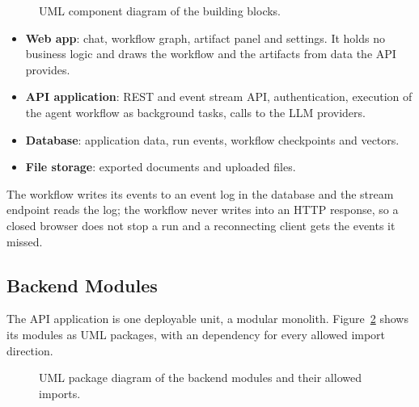 \begin{figure}[H]
    \centering
    \resizebox{\linewidth}{!}{}
    \caption{UML component diagram of the building blocks.}
    \label{fig:sd-building-blocks}
\end{figure}

\begin{itemize}
    \item \textbf{Web app}: chat, workflow graph, artifact panel and settings. It holds no business logic and draws the workflow and the artifacts from data the API provides.
    \item \textbf{API application}: REST and event stream API, authentication, execution of the agent workflow as background tasks, calls to the LLM providers.
    \item \textbf{Database}: application data, run events, workflow checkpoints and vectors.
    \item \textbf{File storage}: exported documents and uploaded files.
\end{itemize}
The workflow writes its events to an event log in the database and the stream endpoint reads the log; the workflow never writes into an HTTP response, so a closed browser does not stop a run and a reconnecting client gets the events it missed.

\subsection{Backend Modules}
\label{sec:sd-backend-modules}
The API application is one deployable unit, a modular monolith. Figure~\ref{fig:sd-backend-modules} shows its modules as UML packages, with an  dependency for every allowed import direction.

\begin{figure}[H]
    \centering
    \resizebox{0.85\linewidth}{!}{}
    \caption{UML package diagram of the backend modules and their allowed imports.}
    \label{fig:sd-backend-modules}
\end{figure}

